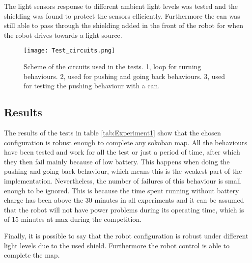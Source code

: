 The light sensors response to different ambient light levels was tested and the shielding was found to protect the sensors efficiently.
Furthermore the can was still able to pass through the shielding added in the front of the robot for when the robot drives towards a light source.


\begin{figure}[H]
\texttt{[image: Test\_circuits.png]}
\centering
\caption[Behaviours used for testing.]{Scheme of the circuits used in the tests. 1, loop for turning behaviours. 2, used for pushing and going back behaviours. 3, used for testing the pushing behaviour with a can. }
\label{fig:testMaps}
\end{figure}


\subsection{Results}
	The results of the tests in table \ref{tab:Experiment1} show that the chosen configuration is robust enough to complete any sokoban map.
	All the behaviours have been tested and work for all the test or just a period of time, after which they then fail mainly because of low battery.
	This happens when doing the pushing and going back behaviour, which means this is the weakest part of the implementation.
	Nevertheless, the number of failures of this behaviour is small enough to be ignored.
This is because the time spent running without battery charge has been above the 30 minutes in all experiments and it can be assumed that the robot will not have power problems during its operating time, which is of 15 minutes at max during the competition.
	
	
	Finally, it is possible to say that the robot configuration is robust under different light levels due to the used shield.
	Furthermore the robot control is able to complete the map.


